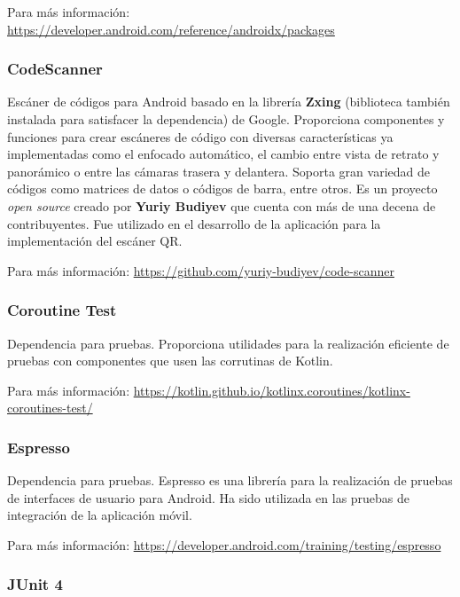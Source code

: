 Para más información: \href{https://developer.android.com/reference/androidx/packages}{https://developer.android.com/reference/androidx/packages}

\subsubsection{CodeScanner}

Escáner de códigos para Android basado en la librería \textbf{Zxing} (biblioteca también instalada para satisfacer la dependencia) de Google. Proporciona componentes y funciones para crear escáneres de código con diversas características ya implementadas como el enfocado automático, el cambio entre vista de retrato y panorámico o entre las cámaras trasera y delantera. Soporta gran variedad de códigos como matrices de datos o códigos de barra, entre otros. Es un proyecto \emph{open source} creado por \textbf{Yuriy Budiyev} que cuenta con más de una decena de contribuyentes. Fue utilizado en el desarrollo de la aplicación para la implementación del escáner QR.

Para más información: \href{https://github.com/yuriy-budiyev/code-scanner}{https://github.com/yuriy-budiyev/code-scanner}

\subsubsection{Coroutine Test}

Dependencia para pruebas. Proporciona utilidades para la realización eficiente de pruebas con componentes que usen las corrutinas de Kotlin.

Para más información: \href{https://kotlin.github.io/kotlinx.coroutines/kotlinx-coroutines-test/}{https://kotlin.github.io/kotlinx.coroutines/kotlinx-coroutines-test/}

\subsubsection{Espresso}
\label{lib:app:espresso}

Dependencia para pruebas. Espresso es una librería para la realización de pruebas de interfaces de usuario para Android. Ha sido utilizada en las pruebas de integración de la aplicación móvil.

Para más información: \href{https://developer.android.com/training/testing/espresso}{https://developer.android.com/training/testing/espresso}

\subsubsection{JUnit 4}
\label{lib:app:junit4}

